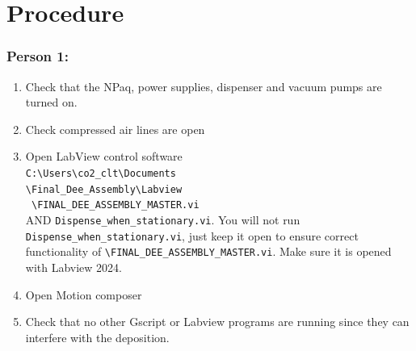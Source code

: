 \documentclass[12pt]{cornelltfpxsop}
\begin{document}
\section{Procedure}
\begin{paracol}{2} %

\subsubsection*{Person 1:}
\begin{enumerate}
    \item Check that the NPaq, power supplies, dispenser and vacuum pumps are\\turned on.
    \item Check compressed air lines are open
    \item Open LabView control software \\ \verb|C:\Users\co2_clt\Documents| \\ \verb|\Final_Dee_Assembly\Labview|\\ \verb| \FINAL_DEE_ASSEMBLY_MASTER.vi|\\ AND
    \verb|Dispense_when_stationary.vi|.  You will not run \verb|Dispense_when_stationary.vi|, just keep it open to ensure correct functionality of \verb|\FINAL_DEE_ASSEMBLY_MASTER.vi|.
    Make sure it is opened with Labview 2024.
    \item Open Motion composer
    \item Check that no other Gscript or Labview programs are running since they can interfere with the deposition.


\end{enumerate}
\end{paracol}
\end{document}
